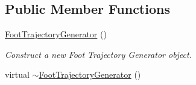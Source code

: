 \subsection*{Public Member Functions}
\begin{DoxyCompactItemize}
\item 
\hyperlink{classow__ftg_1_1FootTrajectoryGenerator_a7b0df6be5461a4dc8752ace3e77c29f4}{Foot\+Trajectory\+Generator} ()\hypertarget{classow__ftg_1_1FootTrajectoryGenerator_a7b0df6be5461a4dc8752ace3e77c29f4}{}\label{classow__ftg_1_1FootTrajectoryGenerator_a7b0df6be5461a4dc8752ace3e77c29f4}

\begin{DoxyCompactList}\small\item\em Construct a new Foot Trajectory Generator object. \end{DoxyCompactList}\item 
virtual \hyperlink{classow__ftg_1_1FootTrajectoryGenerator_a7032c5998c4657dab84c749c1a3504e9}{$\sim$\+Foot\+Trajectory\+Generator} ()\hypertarget{classow__ftg_1_1FootTrajectoryGenerator_a7032c5998c4657dab84c749c1a3504e9}{}\label{classow__ftg_1_1FootTrajectoryGenerator_a7032c5998c4657dab84c749c1a3504e9}


\end{DoxyCompactItemize}
